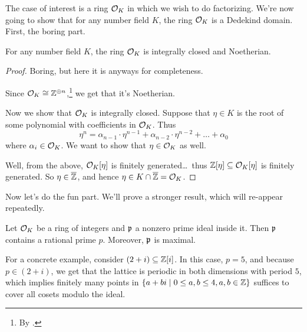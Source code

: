The case of interest is a ring $\mathcal O_K$ in which we wish to do factorizing.
We're now going to show that for any number field $K$, the ring $\mathcal O_K$ is a Dedekind domain.
First, the boring part.
\begin{proposition}
	For any number field $K$, the ring $\mathcal O_K$ is integrally closed and Noetherian.
\end{proposition}
\begin{proof}
	Boring, but here it is anyways for completeness.

	Since $\mathcal O_K \cong \mathbb Z^{\oplus n}$,\footnote{By .}
	we get that it's Noetherian.

	Now we show that $\mathcal O_K$ is integrally closed.
	Suppose that $\eta \in K$ is the root of some polynomial with coefficients in $\mathcal O_K$.
	Thus
	\[ \eta^n = \alpha_{n-1} \cdot \eta^{n-1} + \alpha_{n-2} \cdot \eta^{n-2}
		+ \dots + \alpha_0 \]
	where $\alpha_i \in \mathcal O_K$. We want to show that $\eta \in \mathcal O_K$ as well.

	Well, from the above, $\mathcal O_K[\eta]$ is finitely generated\dots\
	thus $\mathbb Z[\eta] \subseteq \mathcal O_K[\eta]$ is finitely generated.
	So $\eta \in \overline{\mathbb Z}$, and hence $\eta \in K \cap \overline{\mathbb Z} = \mathcal O_K$.
\end{proof}
Now let's do the fun part.
We'll prove a stronger result, which will re-appear repeatedly.
\begin{theorem}
	\label{thm:prime_ideals_over_rational}
	Let $\mathcal O_K$ be a ring of integers
	and $\mathfrak p$ a nonzero prime ideal inside it.
	Then $\mathfrak p$ contains a rational prime $p$.
	Moreover, $\mathfrak p$ is maximal.
\end{theorem}
For a concrete example, consider $(2+i) \subseteq \mathbb Z[i]$. In this case, $p = 5$,
and because $p \in (2+i)$, we get that the lattice is periodic in both dimensions
with period $5$, which implies finitely many points in $\{a+bi \mid 0 \le a, b \le 4, a, b \in \mathbb Z\}$
suffices to cover all cosets modulo the ideal.

